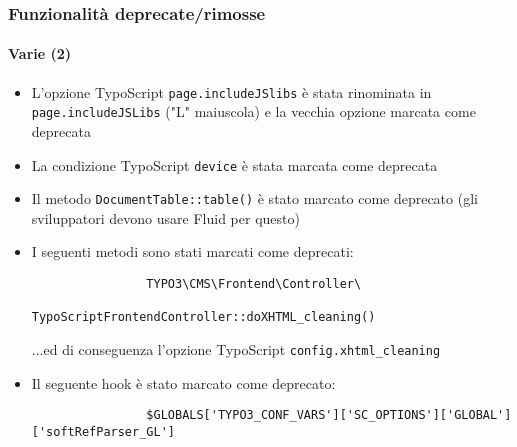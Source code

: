 \begin{frame}[fragile]
	\frametitle{Funzionalità deprecate/rimosse}
	\framesubtitle{Varie (2)}

	\begin{itemize}
		\item L'opzione TypoScript \texttt{page.includeJSlibs} è stata rinominata in\newline
			\texttt{page.includeJSLibs} ("L" maiuscola) e la vecchia opzione marcata come deprecata

		\item La condizione TypoScript \texttt{device} è stata marcata come deprecata

		\item Il metodo \texttt{DocumentTable::table()} è stato marcato come deprecato 
			\small(gli sviluppatori devono usare Fluid per questo)\normalsize

		\item I seguenti metodi sono stati marcati come deprecati:
			\begin{lstlisting}
				TYPO3\CMS\Frontend\Controller\
				    TypoScriptFrontendController::doXHTML_cleaning()
			\end{lstlisting}
			...ed di conseguenza l'opzione TypoScript
			\small
				\texttt{config.xhtml\_cleaning}
			\normalsize

		\item Il seguente hook è stato marcato come deprecato:
			\begin{lstlisting}
				$GLOBALS['TYPO3_CONF_VARS']['SC_OPTIONS']['GLOBAL']['softRefParser_GL']
			\end{lstlisting}
 
	\end{itemize}

\end{frame}


